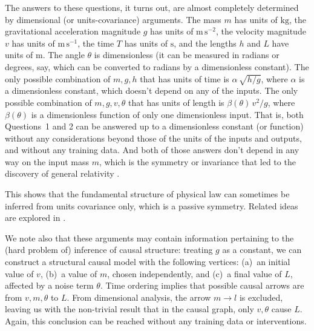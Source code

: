 \documentclass[11pt]{article}
\newcommand{\unit}[1]{\mathrm{#1}}
\newcommand{\kg}{\unit{kg}}
\newcommand{\m}{\unit{m}}
\newcommand{\s}{\unit{s}}
\begin{document}
The answers to these questions, it turns out, are almost completely determined by dimensional (or units-covariance) arguments.
The mass $m$ has units of $\kg$, the gravitational acceleration magnitude $g$ has units of $\m\,\s^{-2}$, the velocity magnitude $v$ has units of $\m\,\s^{-1}$, the time $T$ has units of $\s$, and the lengths $h$ and $L$ have units of $\m$.
The angle $\theta$ is dimensionless (it can be measured in radians or degrees, say, which can be converted to radians by a dimensionless constant).
The only possible combination of $m, g, h$ that has units of time is $\alpha\,\sqrt{h/g}$, where $\alpha$ is a dimensionless constant, which doesn't depend on any of the inputs.
The only possible combination of $m, g, v, \theta$ that has units of length is $\beta(\theta)\,v^2/g$, where $\beta(\theta)$ is a dimensionless function of only one dimensionless input.
That is, both Questions~1 and 2 can be answered up to a dimensionless constant (or function) without any considerations beyond those of the units of the inputs and outputs, and without any training data.
And both of those answers don't depend in any way on the input mass $m$, which is the symmetry or invariance that led to the discovery of general relativity \cite{gr}.

This shows that the fundamental structure of physical law can sometimes be inferred from units covariance only, which is a passive symmetry.  Related ideas are explored in \cite{villar2022dimensionless}.

We note also that these arguments may contain information pertaining to the (hard problem of) inference of causal structure:
treating $g$ as a constant, we can construct a structural causal model with the following vertices: (a)~an initial value of $v$, (b)~a value of $m$, chosen independently, and (c)~a final value of $L$, affected by a noise term $\theta$.
Time ordering implies that possible causal arrows are from $v, m, \theta$ to $L$.
From dimensional analysis, the arrow $m\to l$ is excluded, leaving us with the non-trivial result that in the causal graph, only $v,\theta$ cause $L$.
Again, this conclusion can be reached without any training data or interventions.
\end{document}
